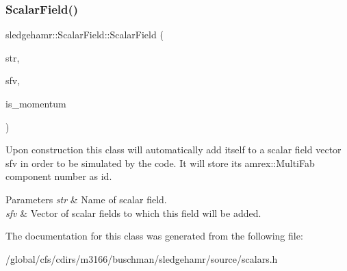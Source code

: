\subsubsection{\texorpdfstring{Scalar\+Field()}{ScalarField()}}
{\footnotesize\ttfamily sledgehamr\+::\+Scalar\+Field\+::\+Scalar\+Field (\begin{DoxyParamCaption}\item[{std\+::string}]{str,  }\item[{std\+::vector$<$ \mbox{\hyperlink{classsledgehamr_1_1ScalarField}{Scalar\+Field}} $\ast$$>$ \&}]{sfv,  }\item[{bool}]{is\+\_\+momentum }\end{DoxyParamCaption})\hspace{0.3cm}{\ttfamily [inline]}}



Upon construction this class will automatically add itself to a scalar field vector sfv in order to be simulated by the code. It will store its amrex\+::\+Multi\+Fab component number as id. 


\begin{DoxyParams}{Parameters}
{\em str} & Name of scalar field. \\
\hline
{\em sfv} & Vector of scalar fields to which this field will be added. \\
\hline
\end{DoxyParams}


The documentation for this class was generated from the following file\+:\begin{DoxyCompactItemize}
\item 
/global/cfs/cdirs/m3166/buschman/sledgehamr/source/scalars.\+h\end{DoxyCompactItemize}
